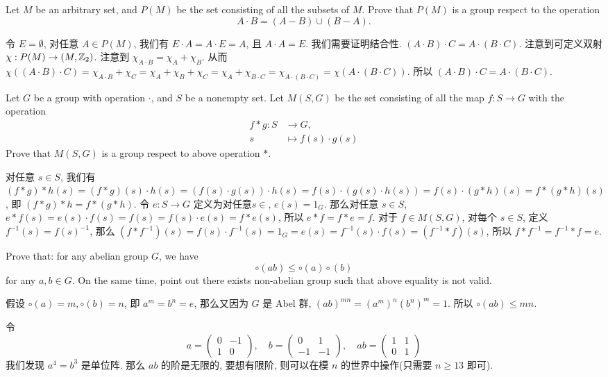 \documentclass{exam-zh}
\newcommand{\ZZ}{{\mathbb{Z}}}
\let \hom \relax
\DeclareMathOperator{\hom}{Hom}
\begin{document}
\begin{question}
  Let $M$ be an arbitrary set, and $P(M)$ be the set consisting of all the subsets of $M$. Prove that $P(M)$ is a group respect to the operation\[A\cdot B=(A-B)\cup (B-A).\]
\end{question}
\begin{solution}
  令 $E=\emptyset$, 对任意 $A\in P(M)$, 我们有 $E\cdot A=A\cdot E=A$, 且 $A\cdot A=E$. 我们需要证明结合性. $(A\cdot B)\cdot C=A\cdot (B\cdot C)$. 注意到可定义双射 $\chi: P(M)\to \hom(M, \ZZ_2)$. 注意到 $\chi_{A\cdot B}=\chi_A+\chi_B$. 从而 $\chi((A\cdot B)\cdot C)=\chi_{A\cdot B}+\chi_C=\chi_A+\chi_B+\chi_C=\chi_A+\chi_{B\cdot C}=\chi_{A\cdot (B\cdot C)}=\chi(A\cdot (B\cdot C))$. 所以 $(A\cdot B)\cdot C=A\cdot (B\cdot C)$.
\end{solution}
\begin{question}
  Let $G$ be a group with operation $\cdot$, and $S$ be a nonempty set. Let $M(S,G)$ be the set consisting of all the map $f: S\to G$ with the operation\[\begin{split}f\ast g: S& \to G,\\s&\mapsto f(s)\cdot g(s)\end{split}\]Prove that $M(S,G)$ is a group respect to above operation $\ast$.
\end{question}
\begin{solution}
  对任意 $s\in S$, 我们有 $(f\ast g)\ast h(s) = (f\ast g)(s)\cdot h(s)=(f(s)\cdot g(s))\cdot h(s)=f(s)\cdot (g(s)\cdot h(s))=f(s)\cdot (g\ast h)(s)=f\ast (g\ast h)(s)$, 即 $(f\ast g)\ast h=f\ast (g\ast h)$. 令 $e:S\to G$ 定义为对任意$s\in $, $e(s)=1_G$. 那么对任意 $s\in S$, $e\ast f(s)=e(s)\cdot f(s)=f(s)=f(s)\cdot e(s)=f\ast e(s)$, 所以 $e\ast f=f\ast e=f$. 对于 $f\in M(S,G)$, 对每个 $s\in S$, 定义 $f^{-1}(s) =f(s)^{-1}$, 那么 $(f\ast f^{-1})(s) = f(s)\cdot f^{-1}(s)=1_G=e(s)=f^{-1}(s)\cdot f(s)=(f^{-1}\ast f)(s)$, 所以 $f\ast f^{-1}=f^{-1}\ast f=e$.
\end{solution}
\begin{question}
  Prove that: for any abelian group $G$, we have\[\circ(ab)\leq \circ(a)\circ(b)\]for any $a,b\in G$. On the same time, point out there exists non-abelian group such that above equality is not valid.
\end{question}
\begin{solution}
  假设 $\circ(a)=m, \circ(b)=n$, 即 $a^m=b^n=e$, 那么又因为 $G$ 是 Abel 群, $(ab)^{mn}=(a^m)^n(b^n)^m=1$. 所以 $\circ(ab)\leq mn$.
  
  令 \[a=\begin{pmatrix}0 & -1\\1 & 0\end{pmatrix}, \quad b=\begin{pmatrix} 0 & 1\\-1 & -1 \end{pmatrix}, \quad ab=\begin{pmatrix} 1 & 1 \\0 & 1\end{pmatrix}\]我们发现 $a^4=b^3$ 是单位阵. 那么 $ab$ 的阶是无限的, 要想有限阶, 则可以在模 $n$ 的世界中操作(只需要 $n\geq 13$ 即可).
\end{solution}
\end{document}
